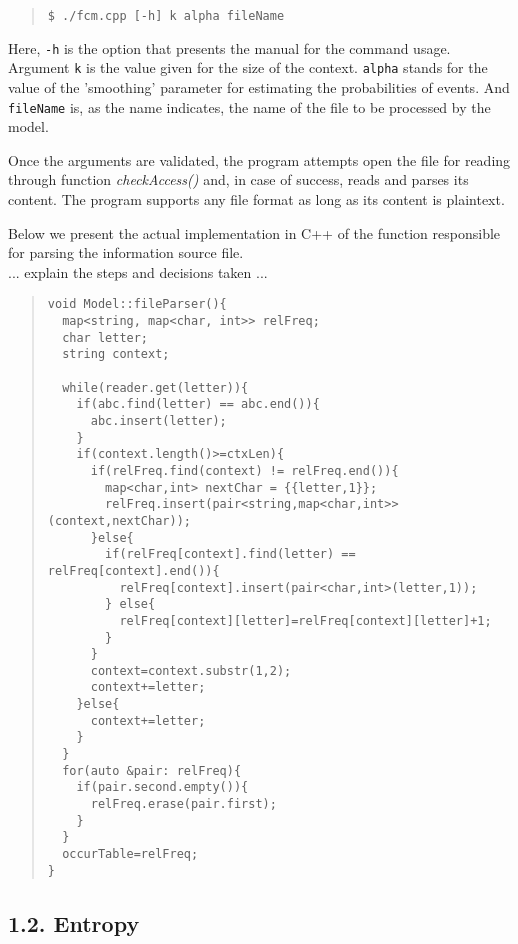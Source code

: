 \documentclass[12pt]{article}
\begin{document}
\begin{quote}
\begin{verbatim}
$ ./fcm.cpp [-h] k alpha fileName
\end{verbatim}
\end{quote}

Here, \texttt{-h} is the option that presents the manual for the command usage.
Argument \texttt{k} is the value given for the size of the context.
\texttt{alpha} stands for the value of the 'smoothing' parameter for estimating
the probabilities of events.
And \texttt{fileName} is, as the name indicates, the name of the file to be
processed by the model.

Once the arguments are validated, the program attempts open the file for reading
through function {\it checkAccess()\/} and, in case of success, reads and parses
its content.
The program supports any file format as long as its content is plaintext.
\newpage 

Below we present the actual implementation in C++ of the function responsible 
for parsing the information source file. \\
... explain the steps and decisions taken ...

\begingroup
\addtolength\leftmargini{-0.4in}
\addtolength\baselineskip{-0.05in}
\begin{quote}
\begin{verbatim}
void Model::fileParser(){
  map<string, map<char, int>> relFreq;
  char letter;
  string context;

  while(reader.get(letter)){
    if(abc.find(letter) == abc.end()){
      abc.insert(letter);
    }
    if(context.length()>=ctxLen){
      if(relFreq.find(context) != relFreq.end()){
        map<char,int> nextChar = {{letter,1}};
        relFreq.insert(pair<string,map<char,int>>(context,nextChar));
      }else{
        if(relFreq[context].find(letter) == relFreq[context].end()){
          relFreq[context].insert(pair<char,int>(letter,1));
        } else{
          relFreq[context][letter]=relFreq[context][letter]+1;
        }
      }
      context=context.substr(1,2);
      context+=letter;
    }else{
      context+=letter;
    }
  }
  for(auto &pair: relFreq){
    if(pair.second.empty()){
      relFreq.erase(pair.first);
    }
  }
  occurTable=relFreq;
}
\end{verbatim}
\end{quote}
\endgroup
\newpage

\subsection*{1.2. Entropy}
\end{document}
